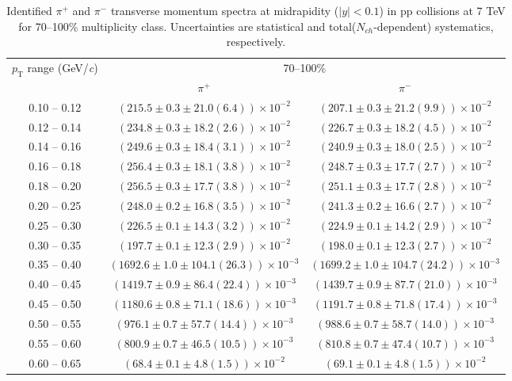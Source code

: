\begin{table}
\caption{Identified $\pi^{+}$ and $\pi^{-}$  transverse momentum spectra at midrapidity ($|y|<0.1$) in pp collisions at 7 TeV for 70--100\% multiplicity class. Uncertainties are statistical and total($N_{ch}$-dependent) systematics, respectively.}
\label{tab:PionPlus_PionMinus_70to100}
\begin{center}
\begin{tabular}{ c | c c }
\hline
\multirow{2}{*}{$p_{\mathrm{T}}$ range (GeV/\textit{c})} & \multicolumn{2}{c}{70--100\%} \\ & $\pi^{+}$& $\pi^{-}$\\ 
\hline
0.10 -- 0.12 & $(215.5\pm0.3\pm21.0(6.4))\times10^{-2}$ & $(207.1\pm0.3\pm21.2(9.9))\times10^{-2}$ \\ 
0.12 -- 0.14 & $(234.8\pm0.3\pm18.2(2.6))\times10^{-2}$ & $(226.7\pm0.3\pm18.2(4.5))\times10^{-2}$ \\ 
0.14 -- 0.16 & $(249.6\pm0.3\pm18.4(3.1))\times10^{-2}$ & $(240.9\pm0.3\pm18.0(2.5))\times10^{-2}$ \\ 
0.16 -- 0.18 & $(256.4\pm0.3\pm18.1(3.8))\times10^{-2}$ & $(248.7\pm0.3\pm17.7(2.7))\times10^{-2}$ \\ 
0.18 -- 0.20 & $(256.5\pm0.3\pm17.7(3.8))\times10^{-2}$ & $(251.1\pm0.3\pm17.7(2.8))\times10^{-2}$ \\ 
0.20 -- 0.25 & $(248.0\pm0.2\pm16.8(3.5))\times10^{-2}$ & $(241.3\pm0.2\pm16.6(2.7))\times10^{-2}$ \\ 
0.25 -- 0.30 & $(226.5\pm0.1\pm14.3(3.2))\times10^{-2}$ & $(224.9\pm0.1\pm14.2(2.9))\times10^{-2}$ \\ 
0.30 -- 0.35 & $(197.7\pm0.1\pm12.3(2.9))\times10^{-2}$ & $(198.0\pm0.1\pm12.3(2.7))\times10^{-2}$ \\ 
0.35 -- 0.40 & $(1692.6\pm1.0\pm104.1(26.3))\times10^{-3}$ & $(1699.2\pm1.0\pm104.7(24.2))\times10^{-3}$ \\ 
0.40 -- 0.45 & $(1419.7\pm0.9\pm86.4(22.4))\times10^{-3}$ & $(1439.7\pm0.9\pm87.7(21.0))\times10^{-3}$ \\ 
0.45 -- 0.50 & $(1180.6\pm0.8\pm71.1(18.6))\times10^{-3}$ & $(1191.7\pm0.8\pm71.8(17.4))\times10^{-3}$ \\ 
0.50 -- 0.55 & $(976.1\pm0.7\pm57.7(14.4))\times10^{-3}$ & $(988.6\pm0.7\pm58.7(14.0))\times10^{-3}$ \\ 
0.55 -- 0.60 & $(800.9\pm0.7\pm46.5(10.5))\times10^{-3}$ & $(810.8\pm0.7\pm47.4(10.7))\times10^{-3}$ \\ 
0.60 -- 0.65 & $(68.4\pm0.1\pm4.8(1.5))\times10^{-2}$ & $(69.1\pm0.1\pm4.8(1.5))\times10^{-2}$ \\ 

\end{tabular}
\end{center}
\end{table}

